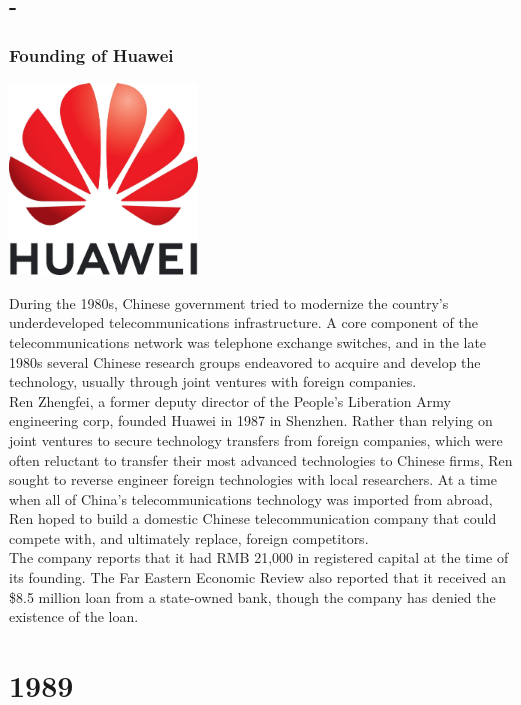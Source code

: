 \documentclass[11pt]{report}
\begin{document}
\section{-}
\subsection{Founding of Huawei}
\vspace{2mm}\begin{center}\includegraphics[width=5cm]{./img/huaweiLogo.jpg}\end{center}
During the 1980s, Chinese government tried to modernize the country's underdeveloped telecommunications infrastructure. A core component of the telecommunications network was telephone exchange switches, and in the late 1980s several Chinese research groups endeavored to acquire and develop the technology, usually through joint ventures with foreign companies.\\
\indent Ren Zhengfei, a former deputy director of the People's Liberation Army engineering corp, founded Huawei in 1987 in Shenzhen. Rather than relying on joint ventures to secure technology transfers from foreign companies, which were often reluctant to transfer their most advanced technologies to Chinese firms, Ren sought to reverse engineer foreign technologies with local researchers. At a time when all of China's telecommunications technology was imported from abroad, Ren hoped to build a domestic Chinese telecommunication company that could compete with, and ultimately replace, foreign competitors.\\
\indent The company reports that it had RMB 21,000 in registered capital at the time of its founding. The Far Eastern Economic Review also reported that it received an \$8.5 million loan from a state-owned bank, though the company has denied the existence of the loan.

\chapter{1989}
\end{document}
